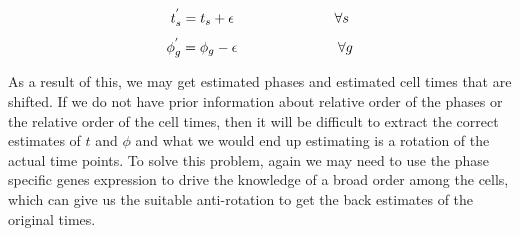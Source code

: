 \documentclass[11pt]{article}
\begin{document}
$$ t^{'}_s = t_{s} + \epsilon \hspace{1 in} \forall s $$
$$ \phi^{'}_{g} = \phi_{g} - \epsilon \hspace{1 in} \forall g $$

As a result of this, we may get estimated phases and estimated cell times that are shifted. If we do not have prior information about relative order of the phases or the relative order of the cell times, then it will be difficult to extract the correct estimates of $t$ and $\phi$ and what we would end up estimating is a rotation of the actual time points. To solve this problem, again we may need to use the phase specific genes expression to drive the knowledge of a broad order among the cells, which can give us the suitable anti-rotation to get the back estimates of the original times.
\end{document}
